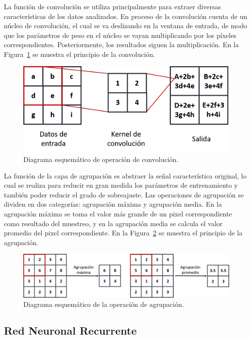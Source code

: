  La función de convolución se utiliza principalmente para extraer diversas características de los datos analizados. En proceso de la convolución cuenta de un núcleo de convolución, el cual se va deslizando en la ventana de entrada, de modo que los parámetros de peso en el núcleo se vayan multiplicando por los píxeles correspondientes. Posteriormente, los resultados siguen la multiplicación. En la Figura~\ref{fig:Convolution} se muestra el principio de la convolución.

 \begin{figure}[!h]
     \centering
     \includegraphics[width=.5\textwidth]{Imagenes/Convolucion.png}
     \caption{Diagrama esquemático de operación de convolución.}
     \label{fig:Convolution}
 \end{figure}

 La función de la capa de agrupación es abstraer la señal característica original, lo cual se realiza para reducir en gran medida los parámetros de entrenamiento y también poder reducir el grado de sobreajuste. Las operaciones de agrupación se dividen en dos categorías: agrupación máxima y agrupación media. En la agrupación máxima se toma el valor más grande de un pixel correspondiente como resultado del muestreo, y en la agrupación media se calcula el valor promedio del pixel correspondiente. En la Figura~\ref{fig:Agrupacion} se muestra el principio de la agrupación.

  \begin{figure}[!h]
     \centering
     \includegraphics[width=.7\textwidth]{Imagenes/Agrupamiento.png}
     \caption{Diagrama esquemático de la operación de agrupación.}
     \label{fig:Agrupacion}
 \end{figure}

 \subsection{Red Neuronal Recurrente}

